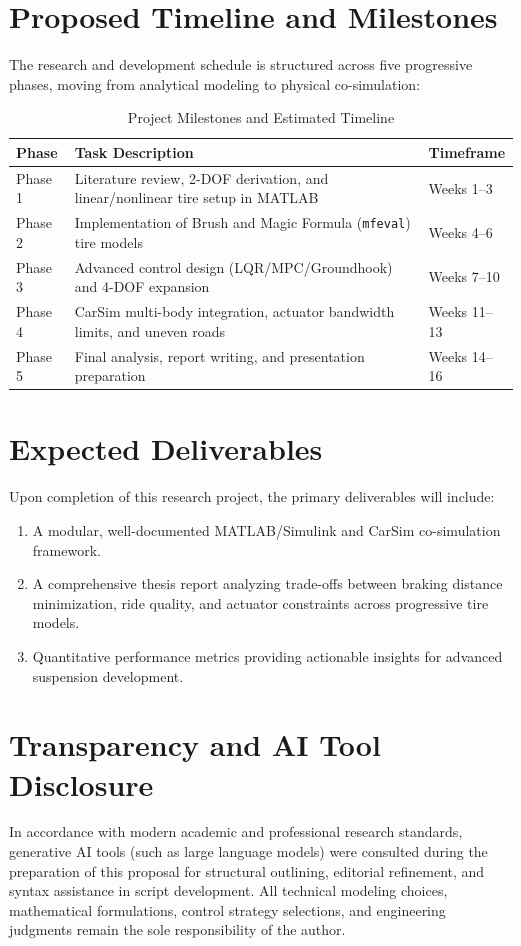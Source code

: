 \documentclass[11pt,a4paper]{article}
\begin{document}
\section{Proposed Timeline and Milestones}
The research and development schedule is structured across five progressive phases, moving from analytical modeling to physical co-simulation:

\begin{table}[H]
\centering
\caption{Project Milestones and Estimated Timeline}
\label{tab:timeline}
\begin{tabular}{lll}
\toprule
\textbf{Phase} & \textbf{Task Description} & \textbf{Timeframe} \\
\midrule
Phase 1 & Literature review, 2-DOF derivation, and linear/nonlinear tire setup in MATLAB & Weeks 1--3 \\
Phase 2 & Implementation of Brush and Magic Formula (\texttt{mfeval}) tire models & Weeks 4--6 \\
Phase 3 & Advanced control design (LQR/MPC/Groundhook) and 4-DOF expansion & Weeks 7--10 \\
Phase 4 & CarSim multi-body integration, actuator bandwidth limits, and uneven roads & Weeks 11--13 \\
Phase 5 & Final analysis, report writing, and presentation preparation & Weeks 14--16 \\
\bottomrule
\end{tabular}
\end{table}

\section{Expected Deliverables}
Upon completion of this research project, the primary deliverables will include:
\begin{enumerate}
    \item A modular, well-documented MATLAB/Simulink and CarSim co-simulation framework.
    \item A comprehensive thesis report analyzing trade-offs between braking distance minimization, ride quality, and actuator constraints across progressive tire models.
    \item Quantitative performance metrics providing actionable insights for advanced suspension development.
\end{enumerate}

\section*{Transparency and AI Tool Disclosure}
In accordance with modern academic and professional research standards, generative AI tools (such as large language models) were consulted during the preparation of this proposal for structural outlining, editorial refinement, and syntax assistance in script development. All technical modeling choices, mathematical formulations, control strategy selections, and engineering judgments remain the sole responsibility of the author.
\end{document}
